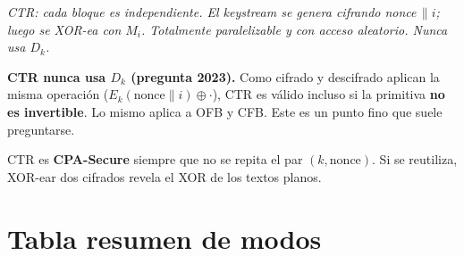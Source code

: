\documentclass[11pt,a4paper]{article}
\newcommand{\diagcaption}[1]{\begin{center}\small\textit{#1}\end{center}}
\begin{document}
\begin{center}
\end{center}
\diagcaption{CTR: cada bloque es independiente. El keystream se genera
  cifrando \textup{nonce}\,$\|i$; luego se XOR-ea con $M_i$. Totalmente
  paralelizable y con acceso aleatorio. Nunca usa $D_k$.}

\begin{examen}
  \textbf{CTR nunca usa $D_k$ (pregunta 2023).} Como cifrado y descifrado
  aplican la misma operaci\'on ($E_k(\mathrm{nonce}\|i)\oplus\cdot$), CTR es
  v\'alido incluso si la primitiva \textbf{no es invertible}. Lo mismo aplica
  a OFB y CFB. Este es un punto fino que suele preguntarse.
\end{examen}

\begin{destacado}
  CTR es \textbf{CPA-Secure} siempre que no se repita el par
  $(k, \mathrm{nonce})$. Si se reutiliza, XOR-ear dos cifrados revela el XOR
  de los textos planos.
\end{destacado}

\section{Tabla resumen de modos}
\end{document}
